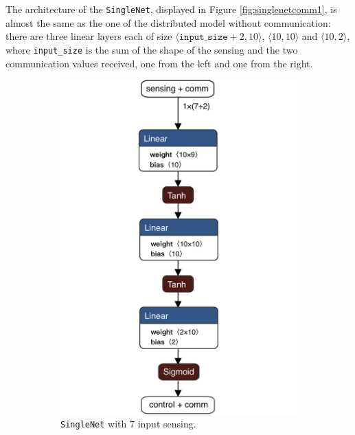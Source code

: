 The architecture of the \texttt{SingleNet}, displayed in Figure 
\ref{fig:singlenetcomm1}, is almost the same as the one of the distributed 
model without communication: there are three linear layers each of size 
$\langle\mathtt{input\_size} + 2, 10\rangle$,  $\langle 10, 
10\rangle$ and $\langle 10, 2\rangle$, where \texttt{input\_size} is the sum 
of the shape of the sensing and the two communication values received, one 
from the left and one from the right.

\begin{figure}[!htb]
	\centering
	\begin{subfigure}[h]{0.495\textwidth}
		\centering
		\includegraphics[width=.8\textwidth]{contents/images/task1distributedcomm@4x}%
		\caption{\texttt{SingleNet} with $7$ input sensing.}
	\end{subfigure}
	\hfill
	\begin{subfigure}[h]{0.495\textwidth}
		\centering

\end{subfigure}
\end{figure}
